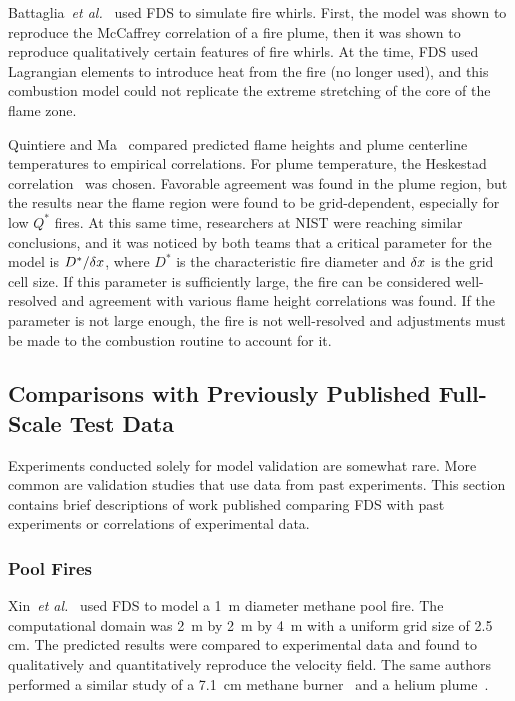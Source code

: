 Battaglia~{\em  et al.}~\cite{Battaglia:1} used  FDS to  simulate fire whirls.   First,  the  model  was  shown to  reproduce  the  McCaffrey
correlation  of  a  fire  plume,   then  it  was  shown  to  reproduce qualitatively certain features  of fire whirls. At the  time, FDS used
Lagrangian elements to introduce heat  from the fire (no longer used), and this  combustion model could not replicate  the extreme stretching of the
core of the flame zone.

Quintiere and Ma~\cite{Ma:2,Ma:3} compared predicted flame heights and plume  centerline temperatures to  empirical correlations.   For plume
temperature,   the  Heskestad   correlation~\cite{SFPE:Heskestad}  was chosen.  Favorable  agreement was found  in the plume region,  but the results
near  the  flame  region  were found  to  be  grid-dependent, especially for  low $Q^*$  fires.  At this  same time,  researchers at NIST were
reaching similar  conclusions, and it  was noticed  by both teams  that a  critical parameter  for the  model is  $D^*/\delta x$, where $D^*$ is the
characteristic fire diameter and $\delta x$  is the grid cell size.  If  this parameter  is  sufficiently  large,  the fire  can  be considered
well-resolved  and  agreement  with various  flame  height correlations was found. If the parameter is not large enough, the fire is not
well-resolved and adjustments  must be made to  the combustion routine to account for it.



\subsection{Comparisons with Previously Published Full-Scale Test Data}
\label{prevpub}

Experiments  conducted  solely   for  model  validation  are  somewhat rare.  More common  are validation  studies  that use  data from  past
experiments.  This   section  contains  brief   descriptions  of  work published  comparing  FDS with  past  experiments  or correlations  of
experimental data.

\subsubsection{Pool Fires}


Xin~{\em et  al.}~\cite{Xin:JSS2005} used FDS to model  a 1~m diameter methane pool  fire.  The  computational domain was  2~m by 2~m  by 4~m with  a
uniform  grid  size of  2.5  cm.  The  predicted results  were compared  to   experimental  data  and  found   to  qualitatively  and quantitatively
reproduce   the  velocity  field.   The  same  authors performed a similar study of a 7.1~cm methane burner~\cite{Xin:CF2005} and a helium
plume~\cite{Xin:CS2002}.

